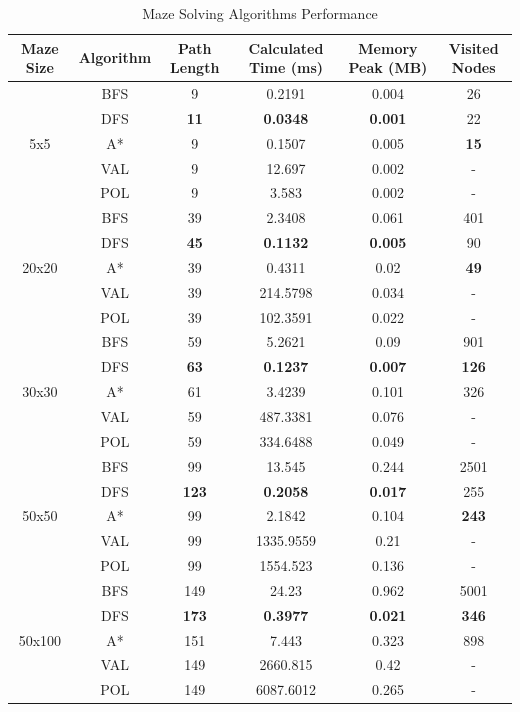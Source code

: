 \documentclass{article}
\begin{document}
\begin{table}[H]
    \centering
    \label{tab:performance}
    \begin{tabular}{cccccc}
    \toprule
    \textbf{Maze Size} & \textbf{Algorithm} & \textbf{Path Length} & \textbf{Calculated Time (ms)} & \textbf{Memory Peak (MB)} & \textbf{Visited Nodes} \\
    \midrule
    \multirow{5}{*}{5x5} & BFS & 9 & 0.2191 & 0.004 & 26 \\
                         & DFS & \textbf{11} & \textbf{0.0348} & \textbf{0.001} & 22 \\
                         & A* & 9 & 0.1507 & 0.005 & \textbf{15} \\
                         & VAL & 9 & 12.697 & 0.002 & - \\
                         & POL & 9 & 3.583 & 0.002 & - \\
    \midrule
    \multirow{5}{*}{20x20} & BFS & 39 & 2.3408 & 0.061 & 401 \\
                           & DFS & \textbf{45} & \textbf{0.1132} & \textbf{0.005} & 90 \\
                           & A* & 39 & 0.4311 & 0.02 & \textbf{49} \\
                           & VAL & 39 & 214.5798 & 0.034 & - \\
                           & POL & 39 & 102.3591 & 0.022 & - \\
    \midrule
    \multirow{5}{*}{30x30} & BFS & 59 & 5.2621 & 0.09 & 901 \\
                           & DFS & \textbf{63} & \textbf{0.1237} & \textbf{0.007} & \textbf{126} \\
                           & A* & 61 & 3.4239 & 0.101 & 326 \\
                           & VAL & 59 & 487.3381 & 0.076 & - \\
                           & POL & 59 & 334.6488 & 0.049 & - \\
    \midrule
    \multirow{5}{*}{50x50} & BFS & 99 & 13.545 & 0.244 & 2501 \\
                           & DFS & \textbf{123} & \textbf{0.2058} & \textbf{0.017} & 255 \\
                           & A* & 99 & 2.1842 & 0.104 & \textbf{243} \\
                           & VAL & 99 & 1335.9559 & 0.21 & - \\
                           & POL & 99 & 1554.523 & 0.136 & - \\
    \midrule
    \multirow{5}{*}{50x100} & BFS & 149 & 24.23 & 0.962 & 5001 \\
                            & DFS & \textbf{173} & \textbf{0.3977} & \textbf{0.021} & \textbf{346} \\
                            & A* & 151 & 7.443 & 0.323 & 898 \\
                            & VAL & 149 & 2660.815 & 0.42 & - \\
                            & POL & 149 & 6087.6012 & 0.265 & - \\
    \bottomrule
    \end{tabular}
    \caption{Maze Solving Algorithms Performance}
\end{table}
\end{document}
